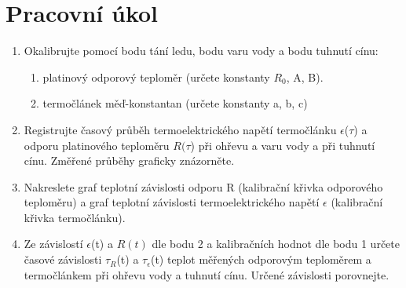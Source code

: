 \documentclass{article}
\author{"Patrik Novotný"}
\begin{document}
\section*{Pracovní úkol}
\begin{enumerate}
\item Okalibrujte pomocí bodu tání ledu, bodu varu vody a bodu tuhnutí cínu:
\begin{enumerate}[label=(\alph*)]
\item platinový odporový teploměr (určete konstanty $R_{0}$, A, B).
\item termočlánek měď-konstantan (určete konstanty a, b, c)
\end{enumerate}
\item Registrujte časový průběh termoelektrického napětí termočlánku $\epsilon$($\tau$) a odporu platinového teploměru $R(\tau$) při ohřevu a varu vody a při tuhnutí cínu. Změřené průběhy graficky znázorněte.
\item Nakreslete graf teplotní závislosti odporu R (kalibrační křivka odporového teploměru) a graf teplotní závislosti termoelektrického napětí $\epsilon$ (kalibrační křivka termočlánku).
\item Ze závislostí $\epsilon$(t) a $R(t)$ dle bodu 2 a kalibračních hodnot dle bodu 1 určete časové závislosti $\tau_{R}$(t) a $\tau_{\epsilon}$(t) teplot měřených odporovým teploměrem a termočlánkem při ohřevu vody a tuhnutí cínu. Určené závislosti porovnejte.
\end{enumerate}
\end{document}
